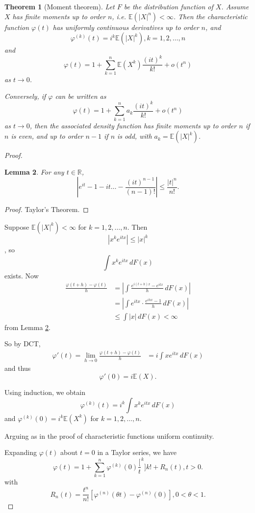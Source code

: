 \documentclass[10pt, oneside, reqno]{amsart}
\theoremstyle{plain}%
\newtheorem{thm}{Theorem}[section]
\newtheorem{lem}[thm]{Lemma}
\theoremstyle{definition}
\theoremstyle{remark}
\renewcommand{\phi}{\varphi}
\newcommand{\R}{\mathbb{R}}
\newcommand{\E}{\mathbb{E}}
\newcommand{\sumnk}{\sum_{k=1}^n}
\begin{document}
\begin{thm}[Moment theorem]
	Let $F$ be the distribution function of $X$.  Assume $X$ has finite moments up to order $n$, i.e. $\E(|X|^n) < \infty$.  Then the characteristic function $\phi(t)$ has uniformly continuous derivatives up to order $n$, and \[
		\phi^{(k)}(t) = i^k \E(|X|^k), k = 1, 2, \dots, n
	\] and \[
		\phi(t) = 1 + \sum_{k=1}^n \E(X^k) \frac{(it)^k}{k!} + o(t^n)
	\] as $t \rightarrow 0$. 
	
	Conversely, if $\phi$ can be written as \[
	\phi(t) = 1 + \sum_{k=1}^n a_k \frac{(it)^k}{k!} + o(t^n)
	\] as $t \rightarrow 0$, then the associated density function has finite moments up to order $n$ if $n$ is even, and up to order $n-1$ if $n$ is odd, with $a_k = \E(|X|^k)$.   
\end{thm}
\begin{proof}

\begin{lem}\label{lem:taylor}
	For any $t \in \R$, \[
		\left|  e^{it} - 1 - it \dots - \frac{(it)^{n-1}}{(n-1)!} \right| \leq \frac{|t|^n}{n!}.
	\]
\end{lem}
\begin{proof}
	Taylor's Theorem.
\end{proof}

Suppose $\E(|X|^k) < \infty$ for $k = 1, 2, \dots, n$.  Then \[
	|x^k e^{itx} | \leq |x|^k\], so \[
		\int x^k e^{itx} \, dF(x)
	\]  exists.  Now \begin{align*}
		\frac{\phi(t+h) - \phi(t)}{h} &= \left| \int \frac{e^{i(t+h)x} - e^{itx}}{h} \, dF(x) \right| \\
		&= \left| \int e^{itx} \cdot \frac{e^{ihx} - 1}{h} \, dF(x) \right| \\
		&\leq \int |x| \, dF(x) < \infty
	\end{align*} from Lemma \ref{lem:taylor}.
	
	So by DCT, \begin{align*}
		\phi'(t) = \lim_{h \rightarrow 0} \frac{\phi(t+h) - \phi(t)}{h} &= i \int x e^{itx}  \, dF(x)
	\end{align*} and thus \[
		\phi'(0) = i \E(X).
	\]

	Using induction, we obtain \[
		\phi^{(k)}(t) = i^k \int x^k e^{itx} \, dF(x)
	\] and $\phi^{(k)}(0) = i^k \E(X^k)$ for $k = 1, 2, \dots, n$. 
	
	Arguing as in the proof of characteristic functions uniform continuity.  
	
	Expanding $\phi(t)$ about $t = 0$ in a Taylor series, we have \[
		\phi(t) = 1 + \sumnk \phi^{(k)}(0) \frac[t^k]{k!} + R_n(t), t > 0.
	\] with \[
		R_n(t) = \frac{t^n}{n!} \left[ \phi^{(n)}(\theta t) - \phi^{(n)}(0) \right], 0 < \theta < 1.
	\]  
	

\end{proof}
\end{document}
